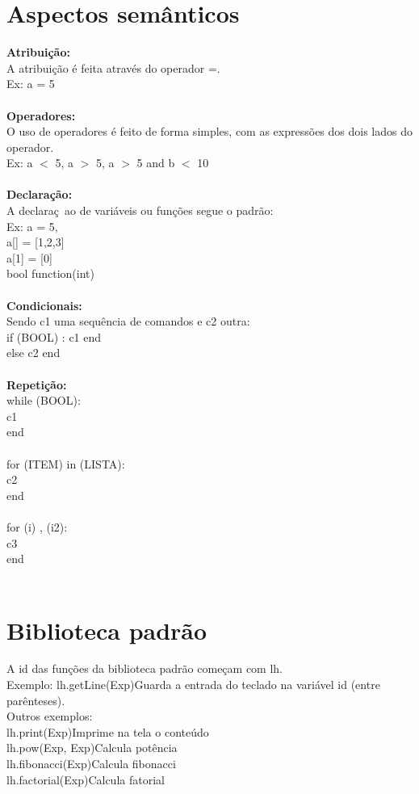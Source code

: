 \documentclass[letterpaper,12pt]{article}
\begin{document}
\section{Aspectos sem\^anticos}
\textbf{Atribui\c{c}\~ao:}\\
A atribui\c{c}\~ao \'e feita atrav\'es do operador =.\\
Ex: a = 5\\
\\
\textbf{Operadores:}\\
O uso de operadores \'e feito de forma simples, com as express\~oes dos dois lados do operador.\\
Ex: a $<$ 5, a $>$ 5, a $>$ 5 and b $<$ 10\\
\\
\textbf{Declara\c{c}\~ao:}\\
A declara\c{c}~ao de vari\'aveis ou fun\c{c}\~oes segue o padr\~ao:\\
Ex: a = 5,\\
a[] = [1,2,3]\\
a[1] = [0]\\
bool function(int)\\
\\
\textbf{Condicionais:}\\
Sendo c1 uma sequ\^encia de comandos e c2 outra:\\
if (BOOL) : c1 end\\
else c2 end\\
\\
\textbf{Repeti\c{c}\~ao:}\\
while (BOOL):\\
    c1\\
end\\
\\
for (ITEM) in (LISTA):\\
    c2\\
end\\
\\
for (i) , (i2):\\
    c3\\
end\\
\\
\section{Biblioteca padr\~ao}
A id das fun\c{c}\~oes da biblioteca padr\~ao come\c{c}am com lh.\\
Exemplo: lh.getLine(Exp)\hspace*{8mm}Guarda a entrada do teclado na vari\'avel id (entre par\^enteses).\\
Outros exemplos:\\
lh.print(Exp)\hspace*{24mm}Imprime na tela o conte\'udo\\
lh.pow(Exp, Exp)\hspace*{24mm}Calcula pot\^encia\\
lh.fibonacci(Exp)\hspace*{24mm}Calcula fibonacci\\
lh.factorial(Exp)\hspace*{24mm}Calcula fatorial\\
\\
\end{document}
